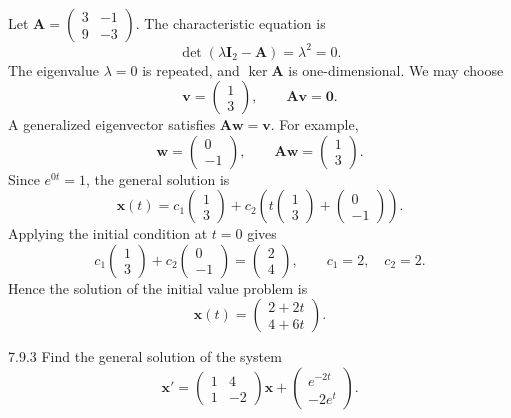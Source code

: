 \documentclass[11pt,oneside]{article}
\begin{document}
\begin{solution}
Let $\mathbf{A}=\begin{pmatrix}3&-1\\9&-3\end{pmatrix}$. The characteristic equation is
\[
    \det(\lambda\mathbf{I}_2-\mathbf{A})=\lambda^2=0.
\]
The eigenvalue $\lambda=0$ is repeated, and $\ker\mathbf{A}$ is one-dimensional. We may choose
\[
    \mathbf{v}=\begin{pmatrix}1\\3\end{pmatrix},
    \qquad \mathbf{A}\mathbf{v}=\mathbf{0}.
\]
A generalized eigenvector satisfies $\mathbf{A}\mathbf{w}=\mathbf{v}$. For example,
\[
    \mathbf{w}=\begin{pmatrix}0\\-1\end{pmatrix},
    \qquad
    \mathbf{A}\mathbf{w}=\begin{pmatrix}1\\3\end{pmatrix}.
\]
Since $e^{0t}=1$, the general solution is
\[
    \mathbf{x}(t)
    =c_1\begin{pmatrix}1\\3\end{pmatrix}
    +c_2\left(
        t\begin{pmatrix}1\\3\end{pmatrix}
        +\begin{pmatrix}0\\-1\end{pmatrix}\right).
\]
Applying the initial condition at $t=0$ gives
\[
    c_1\begin{pmatrix}1\\3\end{pmatrix}
    +c_2\begin{pmatrix}0\\-1\end{pmatrix}
    =\begin{pmatrix}2\\4\end{pmatrix},
    \qquad
    c_1=2,\quad c_2=2.
\]
Hence the solution of the initial value problem is
\[
    \boxed{\mathbf{x}(t)=\begin{pmatrix}2+2t\\4+6t\end{pmatrix}}.
\]
\end{solution}

\begin{problem}{7.9.3}
Find the general solution of the system
\[
    \mathbf{x}'=
    \begin{pmatrix}
        1&4\\
        1&-2
    \end{pmatrix}\mathbf{x}
    +\begin{pmatrix}e^{-2t}\\-2e^t\end{pmatrix}.
\]
\end{problem}
\end{document}
